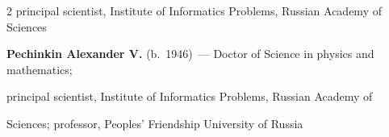 \begin{multicols}{2}
principal scientist, Institute of Informatics Problems,  Russian Academy of Sciences

\columnbreak



































\noindent

\textbf{Pechinkin Alexander V.} (b.\ 1946)~--- Doctor of Science in physics and mathematics;

principal scientist, Institute of Informatics Problems, Russian Academy of

Sciences; professor, Peoples' Friendship University of Russia








\end{multicols}
